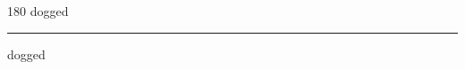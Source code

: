 
\begin{frame}
\begin{center}
\begin{turn}{180}
{\fontsize{2.5cm}{1em}\selectfont dogged}
\end{turn}
\vspace{1em}\par  
\hrule
\vspace{1em}\par  
{\fontsize{2.5cm}{1em}\selectfont dogged}
\end{center}
\end{frame}
